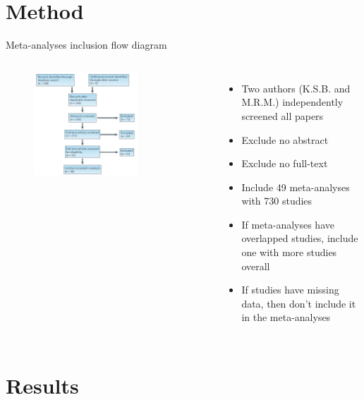 \documentclass{beamer}
\begin{document}
	\section{Method}
		
	\begin{frame}{Meta-analyses inclusion flow diagram}
		\begin{columns}
			\begin{figure}[H]
				\centering
				\includegraphics[width=0.7\textwidth]{pics/method.png}
			\end{figure}
			
			\begin{itemize}
				\item Two authors (K.S.B. and M.R.M.) independently screened all papers
				\item Exclude no abstract
				\item Exclude no full-text
				\item Include 49 meta-analyses with 730 studies
				\item If meta-analyses have overlapped studies, include one with more studies overall
				\item If studies have missing data, then don't include it in the meta-analyses
				
			\end{itemize}
		\end{columns}
		
	\end{frame}
	
	\section{Results}
	
\end{document}
